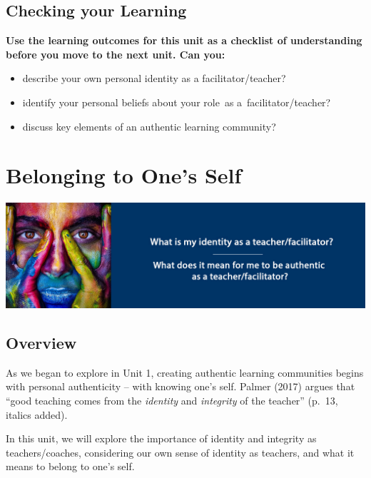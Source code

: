 \documentclass[
]{book}
\providecommand{\tightlist}{%
  \setlength{\itemsep}{0pt}\setlength{\parskip}{0pt}}
\begin{document}
\hypertarget{checking-your-learning}{%
\section*{Checking your Learning}\label{checking-your-learning}}

\begin{progress}
\textbf{Use the learning outcomes for this unit as a checklist of
understanding before you move to the next unit. Can you:}

\begin{itemize}
\tightlist
\item
  describe your own personal identity as a facilitator/teacher?
\item
  identify your personal beliefs about your role~as
  a~facilitator/teacher?
\item
  discuss key elements of an authentic learning community?
\end{itemize}
\end{progress}

\hypertarget{belonging-to-ones-self}{%
\chapter{Belonging to One's Self}\label{belonging-to-ones-self}}

\includegraphics{assets/unit2/LDRS664-BannerUnit2-v3.jpg}

\hypertarget{overview-1}{%
\section*{Overview}\label{overview-1}}

As we began to explore in Unit 1, creating authentic learning communities begins with personal authenticity -- with knowing one's self. Palmer (2017) argues that ``good teaching comes from the \emph{identity} and \emph{integrity} of the teacher'' (p.~13, italics added).

In this unit, we will explore the importance of identity and integrity as teachers/coaches, considering our own sense of identity as teachers, and what it means to belong to one's self.
\end{document}
